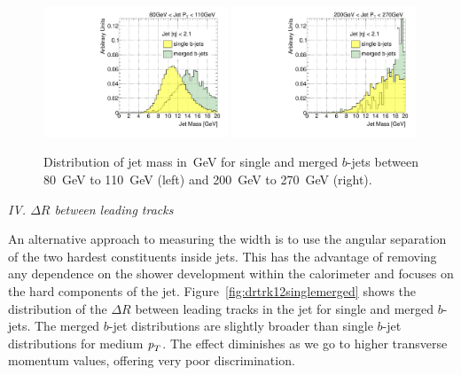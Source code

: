 \begin{figure}[tp]
\centering
\includegraphics[width=0.49\textwidth]{FIGS/VarsSingleMerged/JetMass080.pdf}
\includegraphics[width=0.49\textwidth]{FIGS/VarsSingleMerged/JetMass200.pdf}
\caption{Distribution of jet mass in~GeV for single and merged $b$-jets between 80~GeV to 110~GeV (left) and 200~GeV to 270~GeV (right).}
\label{fig:masssinglemerged}
\end{figure}


{ \em IV. $\Delta R$ between leading tracks}
\vspace{3 mm}

An alternative approach to measuring the width is to use the angular separation of the two hardest constituents inside jets. This has the advantage of removing any dependence on the shower development within the calorimeter and focuses on the hard components of the jet. Figure~\ref{fig:drtrk12singlemerged} shows the distribution of the $\Delta R$ between leading tracks in the jet for single and merged $b$-jets. The merged $b$-jet distributions are slightly broader than single $b$-jet distributions for medium ${\emph{p}_{T}}$. The effect diminishes as we go to higher transverse momentum values, offering very poor discrimination.
\vspace{3 mm}

